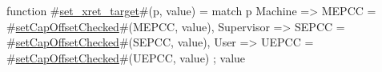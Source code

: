 function #\hyperref[sailRISCVzsetzyxretzytarget]{set\_xret\_target}#(p, value) = {
  match p {
    Machine    => MEPCC = #\hyperref[sailRISCVzsetCapOffsetChecked]{setCapOffsetChecked}#(MEPCC, value),
    Supervisor => SEPCC = #\hyperref[sailRISCVzsetCapOffsetChecked]{setCapOffsetChecked}#(SEPCC, value),
    User       => UEPCC = #\hyperref[sailRISCVzsetCapOffsetChecked]{setCapOffsetChecked}#(UEPCC, value)
  };
  value
}
